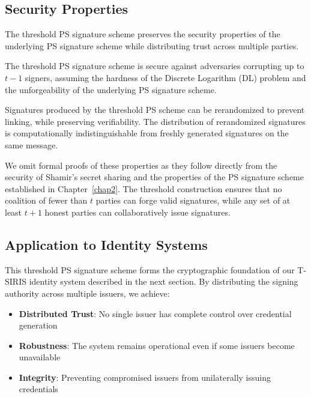 \subsection{Security Properties}

The threshold PS signature scheme preserves the security properties of the underlying PS signature scheme while distributing trust across multiple parties.

\begin{theorem}
The threshold PS signature scheme is secure against adversaries corrupting up to $t-1$ signers, assuming the hardness of the Discrete Logarithm (DL) problem and the unforgeability of the underlying PS signature scheme.
\end{theorem}

\begin{theorem}[Rerandomizability]
Signatures produced by the threshold PS scheme can be rerandomized to prevent linking, while preserving verifiability. The distribution of rerandomized signatures is computationally indistinguishable from freshly generated signatures on the same message.
\end{theorem}

We omit formal proofs of these properties as they follow directly from the security of Shamir's secret sharing and the properties of the PS signature scheme established in Chapter~\ref{chap2}. The threshold construction ensures that no coalition of fewer than $t$ parties can forge valid signatures, while any set of at least $t+1$ honest parties can collaboratively issue signatures.

\subsection{Application to Identity Systems}

This threshold PS signature scheme forms the cryptographic foundation of our T-SIRIS identity system described in the next section. By distributing the signing authority across multiple issuers, we achieve:

\begin{itemize}
    \item \textbf{Distributed Trust}: No single issuer has complete control over credential generation
    \item \textbf{Robustness}: The system remains operational even if some issuers become unavailable
    \item \textbf{Integrity}: Preventing compromised issuers from unilaterally issuing credentials
\end{itemize}


